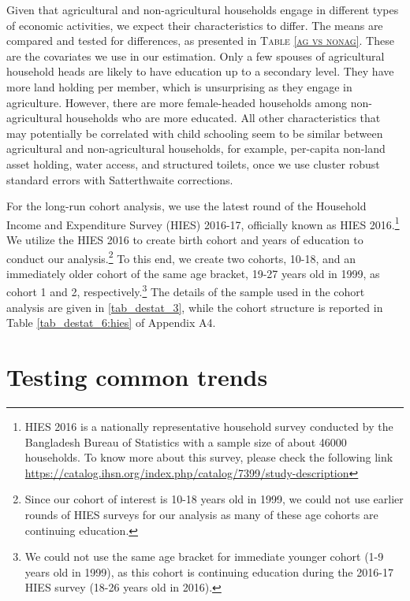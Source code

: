 \documentclass[12pt,letterpaper]{article}
\newcommand{\0}{\ensuremath{\mbox{\boldmath $0$}}}
\begin{document}
Given that agricultural and non-agricultural households engage in different types of economic activities, we expect their characteristics to differ. The means are compared and tested for differences, as presented in \textsc{\small Table \ref{ag vs nonag}}. These are the covariates we use in our estimation. Only a few spouses of agricultural household heads are likely to have education up to a secondary level. They have more land holding per member, which is unsurprising as they engage in agriculture. However, there are more female-headed households among non-agricultural households who are more educated. All other characteristics that may potentially be correlated with child schooling seem to be similar between agricultural and non-agricultural households, for example, per-capita non-land asset holding, water access, and structured toilets, once we use cluster robust standard errors with Satterthwaite corrections.%

For the long-run cohort analysis, we use the latest round of the Household Income and Expenditure Survey (HIES) 2016-17, officially known as HIES 2016.\footnote{HIES 2016 is a nationally representative household survey conducted by the Bangladesh Bureau of Statistics with a sample size of about 46000 households. To know more about this survey, please check the following link \url{https://catalog.ihsn.org/index.php/catalog/7399/study-description}} We utilize the HIES 2016 to create birth cohort and years of education to conduct our analysis.\footnote{Since our cohort of interest is 10-18 years old in 1999, we could not use earlier rounds of HIES surveys for our analysis as many of these age cohorts are continuing education.} To this end, we create two cohorts, 10-18, and an immediately older cohort of the same age bracket, 19-27 years old in 1999, as cohort 1 and 2, respectively.\footnote{We could not use the same age bracket for immediate younger cohort (1-9 years old in 1999), as this cohort is continuing education during the 2016-17 HIES survey (18-26 years old in 2016).} The details of the sample used in the cohort analysis are given in \ref{tab_destat_3}, while the cohort structure is reported in Table \ref{tab_destat_6:hies} of Appendix A4.  


\section{Testing common trends}
\end{document}
